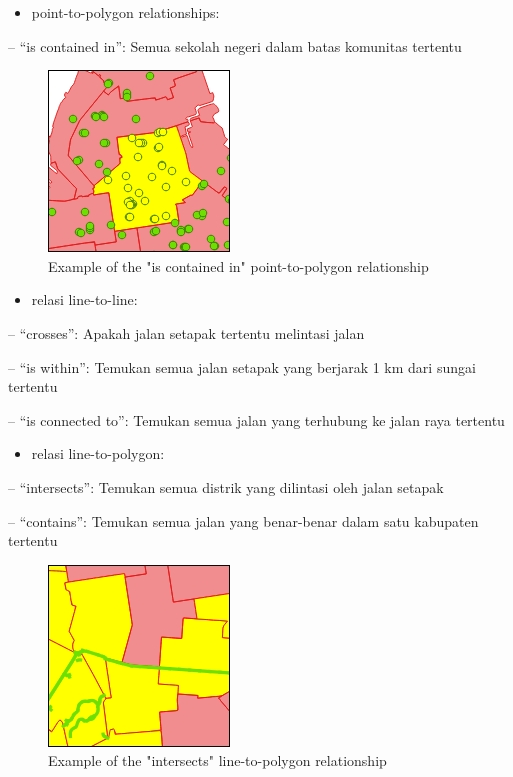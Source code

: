 \documentclass[]{book}
\providecommand{\tightlist}{%
  \setlength{\itemsep}{0pt}\setlength{\parskip}{0pt}}
\begin{document}
\begin{itemize}
\tightlist
\item
  point-to-polygon relationships:
\end{itemize}

-- ``is contained in'': Semua sekolah negeri dalam batas komunitas tertentu

\begin{figure}

{\centering \includegraphics[width=0.2\linewidth]{images/04/fig3} 

}

\caption{Example of the "is contained in" point-to-polygon relationship}\label{fig:fig1403}
\end{figure}

\begin{itemize}
\tightlist
\item
  relasi line-to-line:
\end{itemize}

-- ``crosses'': Apakah jalan setapak tertentu melintasi jalan

-- ``is within'': Temukan semua jalan setapak yang berjarak 1 km dari sungai tertentu

-- ``is connected to'': Temukan semua jalan yang terhubung ke jalan raya tertentu

\begin{itemize}
\tightlist
\item
  relasi line-to-polygon:
\end{itemize}

-- ``intersects'': Temukan semua distrik yang dilintasi oleh jalan setapak

-- ``contains'': Temukan semua jalan yang benar-benar dalam satu kabupaten tertentu

\begin{figure}

{\centering \includegraphics[width=0.2\linewidth]{images/04/fig4} 

}

\caption{Example of the "intersects" line-to-polygon relationship}\label{fig:fig1404}
\end{figure}
\end{document}
